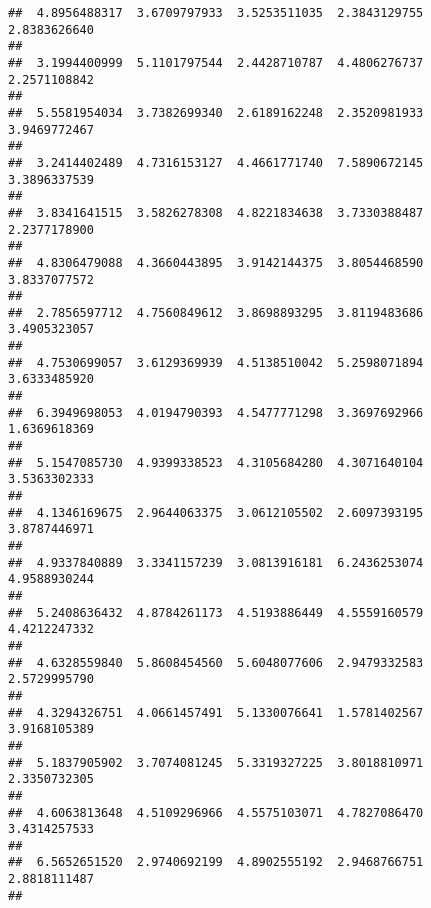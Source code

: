 \documentclass[]{article}
\begin{document}
\begin{verbatim}
##  4.8956488317  3.6709797933  3.5253511035  2.3843129755  2.8383626640 
##                                                                       
##  3.1994400999  5.1101797544  2.4428710787  4.4806276737  2.2571108842 
##                                                                       
##  5.5581954034  3.7382699340  2.6189162248  2.3520981933  3.9469772467 
##                                                                       
##  3.2414402489  4.7316153127  4.4661771740  7.5890672145  3.3896337539 
##                                                                       
##  3.8341641515  3.5826278308  4.8221834638  3.7330388487  2.2377178900 
##                                                                       
##  4.8306479088  4.3660443895  3.9142144375  3.8054468590  3.8337077572 
##                                                                       
##  2.7856597712  4.7560849612  3.8698893295  3.8119483686  3.4905323057 
##                                                                       
##  4.7530699057  3.6129369939  4.5138510042  5.2598071894  3.6333485920 
##                                                                       
##  6.3949698053  4.0194790393  4.5477771298  3.3697692966  1.6369618369 
##                                                                       
##  5.1547085730  4.9399338523  4.3105684280  4.3071640104  3.5363302333 
##                                                                       
##  4.1346169675  2.9644063375  3.0612105502  2.6097393195  3.8787446971 
##                                                                       
##  4.9337840889  3.3341157239  3.0813916181  6.2436253074  4.9588930244 
##                                                                       
##  5.2408636432  4.8784261173  4.5193886449  4.5559160579  4.4212247332 
##                                                                       
##  4.6328559840  5.8608454560  5.6048077606  2.9479332583  2.5729995790 
##                                                                       
##  4.3294326751  4.0661457491  5.1330076641  1.5781402567  3.9168105389 
##                                                                       
##  5.1837905902  3.7074081245  5.3319327225  3.8018810971  2.3350732305 
##                                                                       
##  4.6063813648  4.5109296966  4.5575103071  4.7827086470  3.4314257533 
##                                                                       
##  6.5652651520  2.9740692199  4.8902555192  2.9468766751  2.8818111487 
##                                                                       

\end{verbatim}
\end{document}
